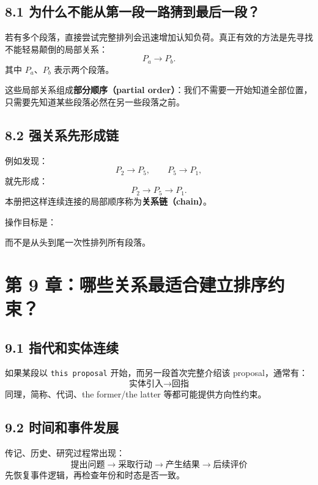 \documentclass[11pt,a4paper]{ctexart}
\newcommand{\term}[2]{\textbf{#1（#2）}}
\begin{document}
\subsection{8.1 为什么不能从第一段一路猜到最后一段？}
若有多个段落，直接尝试完整排列会迅速增加认知负荷。真正有效的方法是先寻找不能轻易颠倒的局部关系：
\[
P_a\rightarrow P_b.
\]
其中 $P_a$、$P_b$ 表示两个段落。

这些局部关系组成\term{部分顺序}{partial order}：我们不需要一开始知道全部位置，只需要先知道某些段落必然在另一些段落之前。

\subsection{8.2 强关系先形成链}
例如发现：
\[
P_2\rightarrow P_5,
\qquad
P_5\rightarrow P_1,
\]
就先形成：
\[
P_2\rightarrow P_5\rightarrow P_1.
\]
本册把这样连续连接的局部顺序称为\term{关系链}{chain}。

操作目标是：
\begin{center}
\end{center}
而不是从头到尾一次性排列所有段落。

\section{第 9 章：哪些关系最适合建立排序约束？}

\subsection{9.1 指代和实体连续}
如果某段以 \texttt{this proposal} 开始，而另一段首次完整介绍该 proposal，通常有：
\[
\text{实体引入}
\rightarrow
\text{回指}
\]
同理，简称、代词、the former/the latter 等都可能提供方向性约束。

\subsection{9.2 时间和事件发展}
传记、历史、研究过程常出现：
\[
\text{提出问题}
\rightarrow
\text{采取行动}
\rightarrow
\text{产生结果}
\rightarrow
\text{后续评价}
\]
先恢复事件逻辑，再检查年份和时态是否一致。
\end{document}
